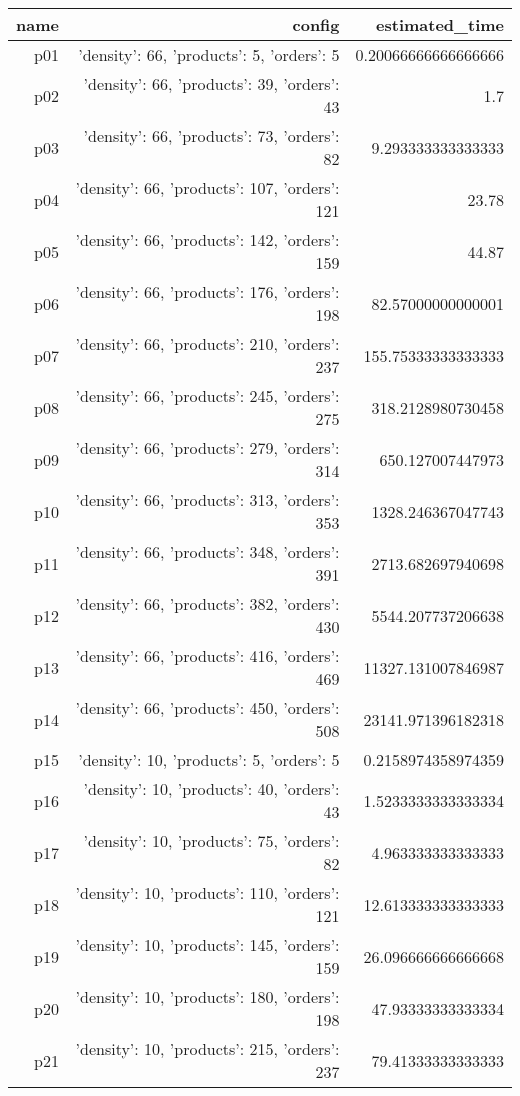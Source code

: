 \documentclass{article}
\begin{document}
                            \begin{center}
                            \scriptsize
                            \begin{tabular}{r|r|r}
                            name & config & estimated\_time\\\midrule
                              p01&{'density': 66, 'products': 5, 'orders': 5}&0.20066666666666666\\
  p02&{'density': 66, 'products': 39, 'orders': 43}&1.7\\
  p03&{'density': 66, 'products': 73, 'orders': 82}&9.293333333333333\\
  p04&{'density': 66, 'products': 107, 'orders': 121}&23.78\\
  p05&{'density': 66, 'products': 142, 'orders': 159}&44.87\\
  p06&{'density': 66, 'products': 176, 'orders': 198}&82.57000000000001\\
  p07&{'density': 66, 'products': 210, 'orders': 237}&155.75333333333333\\
  p08&{'density': 66, 'products': 245, 'orders': 275}&318.2128980730458\\
  p09&{'density': 66, 'products': 279, 'orders': 314}&650.127007447973\\
  p10&{'density': 66, 'products': 313, 'orders': 353}&1328.246367047743\\
  p11&{'density': 66, 'products': 348, 'orders': 391}&2713.682697940698\\
  p12&{'density': 66, 'products': 382, 'orders': 430}&5544.207737206638\\
  p13&{'density': 66, 'products': 416, 'orders': 469}&11327.131007846987\\
  p14&{'density': 66, 'products': 450, 'orders': 508}&23141.971396182318\\
  p15&{'density': 10, 'products': 5, 'orders': 5}&0.2158974358974359\\
  p16&{'density': 10, 'products': 40, 'orders': 43}&1.5233333333333334\\
  p17&{'density': 10, 'products': 75, 'orders': 82}&4.963333333333333\\
  p18&{'density': 10, 'products': 110, 'orders': 121}&12.613333333333333\\
  p19&{'density': 10, 'products': 145, 'orders': 159}&26.096666666666668\\
  p20&{'density': 10, 'products': 180, 'orders': 198}&47.93333333333334\\
  p21&{'density': 10, 'products': 215, 'orders': 237}&79.41333333333333\\

\end{tabular}
\end{center}
\end{document}
